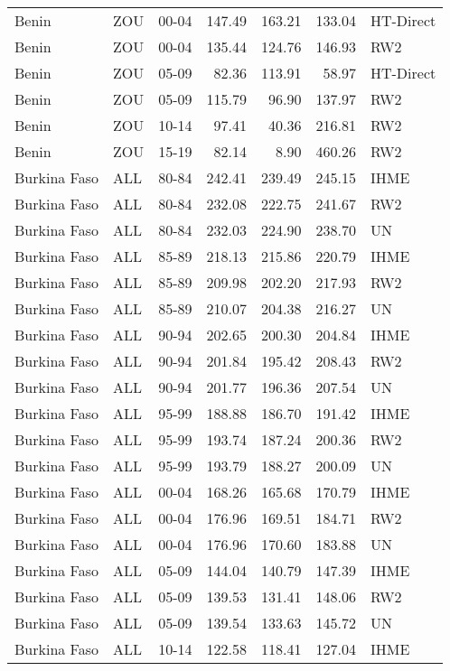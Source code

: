 \begin{longtable}{lllrrrl}
  Benin & ZOU & 00-04 & 147.49 & 163.21 & 133.04 & HT-Direct \\ 
  Benin & ZOU & 00-04 & 135.44 & 124.76 & 146.93 & RW2 \\ 
  Benin & ZOU & 05-09 & 82.36 & 113.91 & 58.97 & HT-Direct \\ 
  Benin & ZOU & 05-09 & 115.79 & 96.90 & 137.97 & RW2 \\ 
  Benin & ZOU & 10-14 & 97.41 & 40.36 & 216.81 & RW2 \\ 
  Benin & ZOU & 15-19 & 82.14 & 8.90 & 460.26 & RW2 \\ 
  Burkina Faso & ALL & 80-84 & 242.41 & 239.49 & 245.15 & IHME \\ 
  Burkina Faso & ALL & 80-84 & 232.08 & 222.75 & 241.67 & RW2 \\ 
  Burkina Faso & ALL & 80-84 & 232.03 & 224.90 & 238.70 & UN \\ 
  Burkina Faso & ALL & 85-89 & 218.13 & 215.86 & 220.79 & IHME \\ 
  Burkina Faso & ALL & 85-89 & 209.98 & 202.20 & 217.93 & RW2 \\ 
  Burkina Faso & ALL & 85-89 & 210.07 & 204.38 & 216.27 & UN \\ 
  Burkina Faso & ALL & 90-94 & 202.65 & 200.30 & 204.84 & IHME \\ 
  Burkina Faso & ALL & 90-94 & 201.84 & 195.42 & 208.43 & RW2 \\ 
  Burkina Faso & ALL & 90-94 & 201.77 & 196.36 & 207.54 & UN \\ 
  Burkina Faso & ALL & 95-99 & 188.88 & 186.70 & 191.42 & IHME \\ 
  Burkina Faso & ALL & 95-99 & 193.74 & 187.24 & 200.36 & RW2 \\ 
  Burkina Faso & ALL & 95-99 & 193.79 & 188.27 & 200.09 & UN \\ 
  Burkina Faso & ALL & 00-04 & 168.26 & 165.68 & 170.79 & IHME \\ 
  Burkina Faso & ALL & 00-04 & 176.96 & 169.51 & 184.71 & RW2 \\ 
  Burkina Faso & ALL & 00-04 & 176.96 & 170.60 & 183.88 & UN \\ 
  Burkina Faso & ALL & 05-09 & 144.04 & 140.79 & 147.39 & IHME \\ 
  Burkina Faso & ALL & 05-09 & 139.53 & 131.41 & 148.06 & RW2 \\ 
  Burkina Faso & ALL & 05-09 & 139.54 & 133.63 & 145.72 & UN \\ 
  Burkina Faso & ALL & 10-14 & 122.58 & 118.41 & 127.04 & IHME \\ 

\end{longtable}
